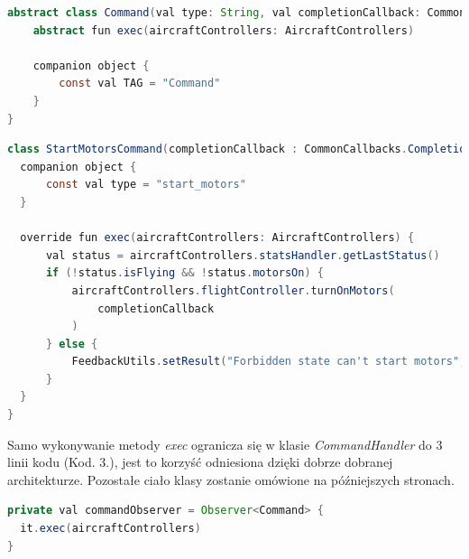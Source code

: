 \begin{lstlisting}[language=Java, caption=Klasa \textit{Command}]
  abstract class Command(val type: String, val completionCallback: CommonCallbacks.CompletionCallback<DJIError>) {
    abstract fun exec(aircraftControllers: AircraftControllers)

    companion object {
        const val TAG = "Command"
    }
}
\end{lstlisting}

\begin{lstlisting}[language=Java, caption=Klasa \textit{StartMotorsCommand}]
class StartMotorsCommand(completionCallback : CommonCallbacks.CompletionCallback<DJIError>) : Command(type, completionCallback) {
  companion object {
      const val type = "start_motors"
  }

  override fun exec(aircraftControllers: AircraftControllers) {
      val status = aircraftControllers.statsHandler.getLastStatus()
      if (!status.isFlying && !status.motorsOn) {
          aircraftControllers.flightController.turnOnMotors(
              completionCallback
          )
      } else {
          FeedbackUtils.setResult("Forbidden state can't start motors", TAG)
      }
  }
}
\end{lstlisting}

\newpage
Samo wykonywanie metody \textit{exec} ogranicza się w klasie \textit{CommandHandler} do 3 linii kodu (Kod. 3.), jest to korzyść odniesiona dzięki dobrze dobranej architekturze. Pozostałe ciało klasy zostanie omówione na późniejszych stronach.


\begin{lstlisting}[language=Java, caption=Fragment kodu z CommandHandler]
private val commandObserver = Observer<Command> {
  it.exec(aircraftControllers)
}
\end{lstlisting}

